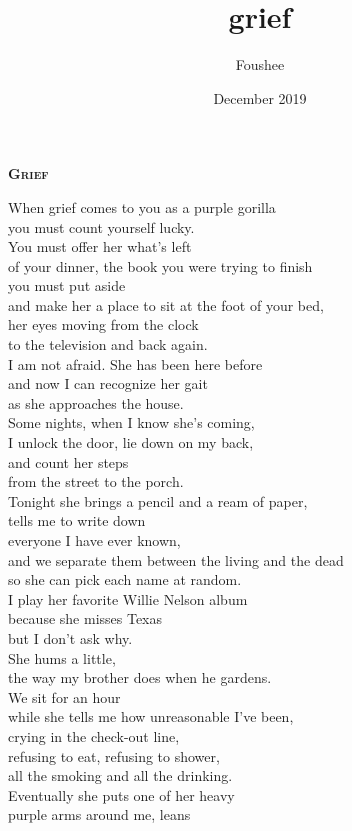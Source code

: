 \documentclass[10pt]{memoir}
\title{grief}
\author{Foushee}
\date{December 2019}
\begin{document}
\begin{multicols}{2}
\thispagestyle{empty}
\noindent \textbf{\textsc{\Large Grief}}
\vspace{18pt}

{
When grief comes to you as a purple gorilla\\
you must count yourself lucky.\\
You must offer her what's left\\
of your dinner, the book you were trying to finish\\
you must put aside\\
and make her a place to sit at the foot of your bed,\\
her eyes moving from the clock\\
to the television and back again.\\
I am not afraid. She has been here before\\
and now I can recognize her gait\\
as she approaches the house.\\
Some nights, when I know she's coming,\\
I unlock the door, lie down on my back,\\
and count her steps\\
from the street to the porch.\\
Tonight she brings a pencil and a ream of paper,\\
tells me to write down\\
everyone I have ever known,\\
and we separate them between the living and the dead\\
so she can pick each name at random.\\
I play her favorite Willie Nelson album\\
because she misses Texas\\
but I don't ask why.\\
She hums a little,\\
the way my brother does when he gardens.\\
We sit for an hour\\
while she tells me how unreasonable I've been,\\
crying in the check-out line,\\
refusing to eat, refusing to shower,\\
all the smoking and all the drinking.\\
Eventually she puts one of her heavy\\
purple arms around me, leans\\
}
\end{multicols}
\end{document}
